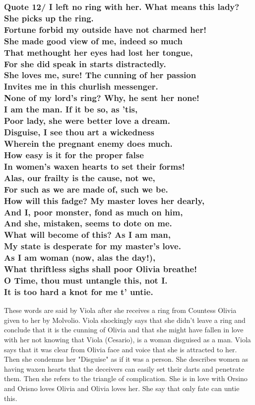 \documentclass[12pt, a4paper]{article}
\begin{document}
\subsubsection*{Quote 12/
I left no ring with her. What means this lady?\\
She picks up the ring.\\
Fortune forbid my outside have not charmed her!\\
She made good view of me, indeed so much\\
That methought her eyes had lost her tongue,\\
For she did speak in starts distractedly.\\
She loves me, sure! The cunning of her passion\\
Invites me in this churlish messenger.\\
None of my lord’s ring? Why, he sent her none!\\
I am the man. If it be so, as ’tis,\\
Poor lady, she were better love a dream.\\
Disguise, I see thou art a wickedness\\
Wherein the pregnant enemy does much.\\
How easy is it for the proper false\\
In women’s waxen hearts to set their forms!\\
Alas, our frailty is the cause, not we,\\
For such as we are made of, such we be.\\
How will this fadge? My master loves her dearly,\\
And I, poor monster, fond as much on him,\\
And she, mistaken, seems to dote on me.\\
What will become of this? As I am man,\\
My state is desperate for my master’s love.\\
As I am woman (now, alas the day!),\\
What thriftless sighs shall poor Olivia breathe!\\
O Time, thou must untangle this, not I.\\
It is too hard a knot for me t’ untie.
}

These words are said by Viola after she receives a ring from Countess 
Olivia given to her by Molvolio. Viola shockingly says that she didn't leave 
a ring and conclude that it is the cunning of Olivia and that she 
might have fallen in love with her not knowing that Viola (Cesario),
is a woman disguised as a man. Viola says that it was clear from Olivia 
face and voice that she is attracted to her. Then she condemns her
"Disguise" as if it was a person. She describes women as having waxen
hearts that the deceivers can easily set their darts and penetrate them.
Then she refers to the triangle of complication. She is in love with
Orsino and Orisno loves Olivia and Olivia loves her. She say that 
only fate can untie this.\medbreak
\end{document}
